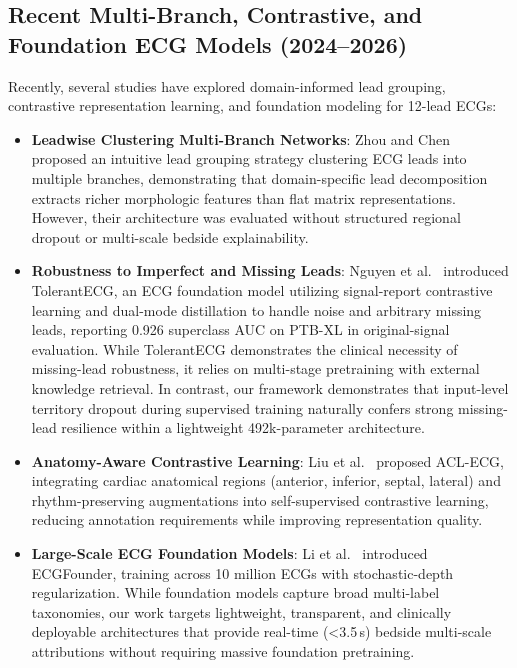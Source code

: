 \documentclass[5p,twocolumn,10pt]{elsarticle}
\begin{document}
\subsection{Recent Multi-Branch, Contrastive, and Foundation ECG Models (2024--2026)}
Recently, several studies have explored domain-informed lead grouping, contrastive representation learning, and foundation modeling for 12-lead ECGs:
\begin{itemize}
    \item \textbf{Leadwise Clustering Multi-Branch Networks}: Zhou and Chen~\cite{zhou2024leadwise} proposed an intuitive lead grouping strategy clustering ECG leads into multiple branches, demonstrating that domain-specific lead decomposition extracts richer morphologic features than flat matrix representations. However, their architecture was evaluated without structured regional dropout or multi-scale bedside explainability.
    \item \textbf{Robustness to Imperfect and Missing Leads}: Nguyen et al.~\cite{nguyen2025tolerantecg} introduced TolerantECG, an ECG foundation model utilizing signal-report contrastive learning and dual-mode distillation to handle noise and arbitrary missing leads, reporting 0.926 superclass AUC on PTB-XL in original-signal evaluation. While TolerantECG demonstrates the clinical necessity of missing-lead robustness, it relies on multi-stage pretraining with external knowledge retrieval. In contrast, our framework demonstrates that input-level territory dropout during supervised training naturally confers strong missing-lead resilience within a lightweight 492k-parameter architecture.
    \item \textbf{Anatomy-Aware Contrastive Learning}: Liu et al.~\cite{liu2026acl} proposed ACL-ECG, integrating cardiac anatomical regions (anterior, inferior, septal, lateral) and rhythm-preserving augmentations into self-supervised contrastive learning, reducing annotation requirements while improving representation quality.
    \item \textbf{Large-Scale ECG Foundation Models}: Li et al.~\cite{li2025ecgfounder} introduced ECGFounder, training across 10 million ECGs with stochastic-depth regularization. While foundation models capture broad multi-label taxonomies, our work targets lightweight, transparent, and clinically deployable architectures that provide real-time (<3.5\,s) bedside multi-scale attributions without requiring massive foundation pretraining.
\end{itemize}
\end{document}
